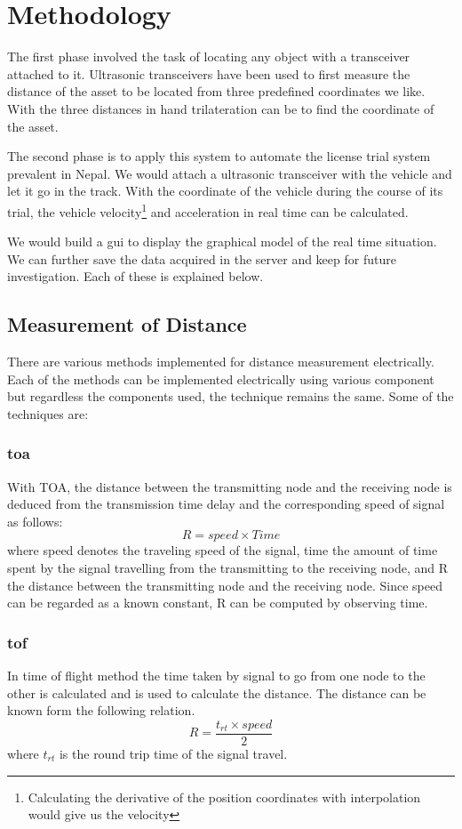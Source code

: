 \section{Methodology}
The first phase involved the task of locating any object with a transceiver attached to it. Ultrasonic transceivers have been used to first measure the distance of the asset to be located from three predefined coordinates we like. With the three distances in hand trilateration can be to find the coordinate of the asset.

The second phase is to apply this system to automate the license trial system prevalent  in Nepal. We would attach a ultrasonic transceiver with the vehicle and let it go in the track. With the coordinate of the vehicle during the course of its trial, the vehicle velocity\footnote{Calculating the derivative of the position coordinates with interpolation would give us the velocity} and acceleration in real time can be calculated. 

We would build a \gls{gui} to display the graphical model of the real time situation. We can further save the data acquired in the server and keep for future investigation. Each of these is explained below.

\subsection{Measurement of Distance}
There are various methods implemented for distance measurement electrically. Each of the methods can be implemented electrically using various component but regardless the components used, the technique remains the same. Some of the techniques are:
\subsubsection{\gls{toa}}
With TOA, the distance between the transmitting node and the receiving node is deduced from the transmission time delay and the corresponding speed of signal as follows:
\begin{equation}
	R = speed \times Time
\end{equation}
where speed denotes the traveling speed of the signal, time the amount of time spent by the signal travelling from the transmitting to the receiving node, and R the distance between the transmitting node and the receiving node. Since speed can be regarded as a known constant, R can be computed by observing time.\cite{1003.1833}

\subsubsection{\gls{tof}}
In time of flight method the time taken by signal to go from one node to the other is calculated and is used to calculate the distance. The distance can be known form the following relation.
\begin{equation}
	R = \frac{t_{rt} \times speed}{2}
\end{equation}
where $t_{rt}$ is the round trip time of the signal travel.


